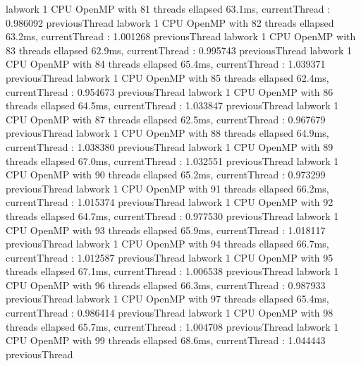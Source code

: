 labwork 1 CPU OpenMP with 81 threads ellapsed 63.1ms, currentThread : 0.986092 previousThread
labwork 1 CPU OpenMP with 82 threads ellapsed 63.2ms, currentThread : 1.001268 previousThread
labwork 1 CPU OpenMP with 83 threads ellapsed 62.9ms, currentThread : 0.995743 previousThread
labwork 1 CPU OpenMP with 84 threads ellapsed 65.4ms, currentThread : 1.039371 previousThread
labwork 1 CPU OpenMP with 85 threads ellapsed 62.4ms, currentThread : 0.954673 previousThread
labwork 1 CPU OpenMP with 86 threads ellapsed 64.5ms, currentThread : 1.033847 previousThread
labwork 1 CPU OpenMP with 87 threads ellapsed 62.5ms, currentThread : 0.967679 previousThread
labwork 1 CPU OpenMP with 88 threads ellapsed 64.9ms, currentThread : 1.038380 previousThread
labwork 1 CPU OpenMP with 89 threads ellapsed 67.0ms, currentThread : 1.032551 previousThread
labwork 1 CPU OpenMP with 90 threads ellapsed 65.2ms, currentThread : 0.973299 previousThread
labwork 1 CPU OpenMP with 91 threads ellapsed 66.2ms, currentThread : 1.015374 previousThread
labwork 1 CPU OpenMP with 92 threads ellapsed 64.7ms, currentThread : 0.977530 previousThread
labwork 1 CPU OpenMP with 93 threads ellapsed 65.9ms, currentThread : 1.018117 previousThread
labwork 1 CPU OpenMP with 94 threads ellapsed 66.7ms, currentThread : 1.012587 previousThread
labwork 1 CPU OpenMP with 95 threads ellapsed 67.1ms, currentThread : 1.006538 previousThread
labwork 1 CPU OpenMP with 96 threads ellapsed 66.3ms, currentThread : 0.987933 previousThread
labwork 1 CPU OpenMP with 97 threads ellapsed 65.4ms, currentThread : 0.986414 previousThread
labwork 1 CPU OpenMP with 98 threads ellapsed 65.7ms, currentThread : 1.004708 previousThread
labwork 1 CPU OpenMP with 99 threads ellapsed 68.6ms, currentThread : 1.044443 previousThread

